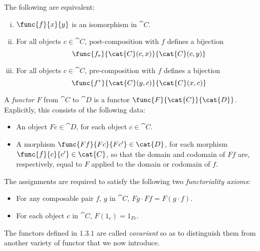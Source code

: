 \documentclass[main.tex]{subfiles}
\begin{document}
\begin{lemma}
	The following are equivalent:
	\begin{enumerate}[(i)]
		\item $\func{f}{x}{y}$ is an isomorphism in $\cat{C}$.

		\item For all objects $c\in\cat{C}$, post-composition with $f$ defines a
			bijection \[\func{f_*}{\cat{C}(c,x)}{\cat{C}(c,y)}\]

		\item For all objects $c\in\cat{C}$, pre-composition with $f$ defines a
			bijection \[\func{f^*}{\cat{C}(y,c)}{\cat{C}(x,c)}\]
	\end{enumerate}
\end{lemma}

\begin{definition}
	A \emph{functor} $F$ from $\cat{C}$ to $\cat{D}$ is a functor
	$\func{F}{\cat{C}}{\cat{D}}$. Explicitly, this consists of the following
	data:
	\begin{itemize}
		\item An object $Fc\in \cat{D}$, for each object $c\in \cat{C}$.

		\item A morphism $\func{Ff}{Fc}{Fc'}\in \cat{D}$, for each morphism
			$\func{f}{c}{c'}\in \cat{C}$, so that the domain and codomain of
			$Ff$ are, respectively, equal to $F$ applied to the domain or
			codomain of $f$.
	\end{itemize}
	The assignments are required to satisfy the following two
	\emph{functoriality axioms}:
	\begin{itemize}
		\item For any composable pair $f$, $g$ in $\cat{C}$, $Fg\cdot Ff =
			F(g\cdot f)$.

		\item For each object $c$ in $\cat{C}$, $F(1_c) = 1_{Fc}$.
	\end{itemize}
\end{definition}
The functors defined in $1.3.1$ are called \emph{covariant} so as to distinguish
them from another variety of functor that we now introduce.
\end{document}

